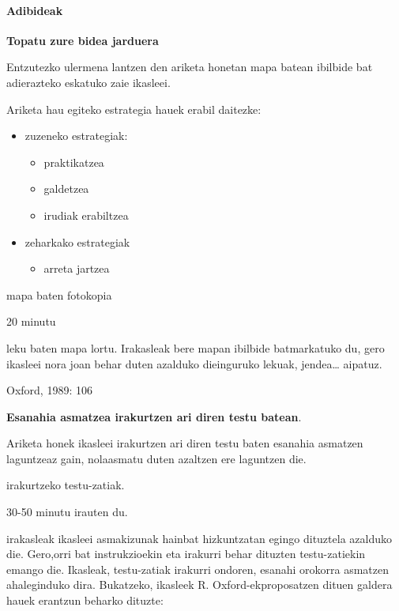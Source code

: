 \documentclass[
]{book}
\providecommand{\tightlist}{%
  \setlength{\itemsep}{0pt}\setlength{\parskip}{0pt}}
\begin{document}
\hypertarget{adibideak}{%
\paragraph{Adibideak}\label{adibideak}}

\textbf{Topatu zure bidea jarduera}

Entzutezko ulermena lantzen den ariketa honetan mapa batean ibilbide bat adierazteko eskatuko zaie ikasleei.

Ariketa hau egiteko estrategia hauek erabil daitezke:

\begin{itemize}
\tightlist
\item
  zuzeneko estrategiak:

  \begin{itemize}
  \tightlist
  \item
    praktikatzea
  \item
    galdetzea
  \item
    irudiak erabiltzea
  \end{itemize}
\item
  zeharkako estrategiak

  \begin{itemize}
  \tightlist
  \item
    arreta jartzea
  \end{itemize}
\end{itemize}

\begin{description}
\tightlist
\item[Baliabide materiala]
mapa baten fotokopia
\item[Denbora]
20 minutu
\item[Nola egin]
leku baten mapa lortu. Irakasleak bere mapan ibilbide batmarkatuko du, gero ikasleei nora joan behar duten azalduko dieinguruko lekuak, jendea\ldots{} aipatuz.
\end{description}

Oxford, 1989: 106

\textbf{Esanahia asmatzea irakurtzen ari diren testu batean}.

Ariketa honek ikasleei irakurtzen ari diren testu baten esanahia asmatzen laguntzeaz gain, nolaasmatu duten azaltzen ere laguntzen die.

\begin{description}
\tightlist
\item[Baliabide materiala]
irakurtzeko testu-zatiak.
\item[Denbora]
30-50 minutu irauten du.
\item[Nola egin]
irakasleak ikasleei asmakizunak hainbat hizkuntzatan egingo dituztela azalduko die.
Gero,orri bat instrukzioekin eta irakurri behar dituzten testu-zatiekin emango die.
Ikasleak, testu-zatiak irakurri ondoren, esanahi orokorra asmatzen ahaleginduko dira.
Bukatzeko, ikasleek R. Oxford-ekproposatzen dituen galdera hauek erantzun beharko dituzte:
\end{description}
\end{document}
